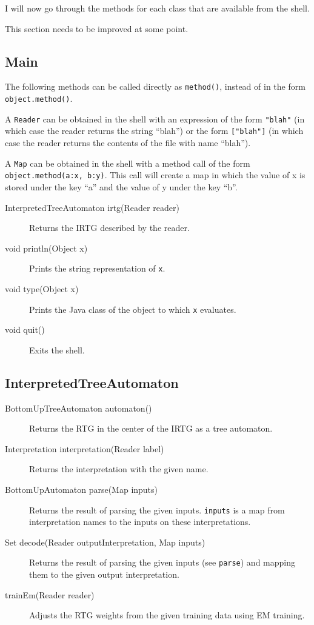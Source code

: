 \documentclass[11pt]{article}
\begin{document}
I will now go through the methods for each class that are available
from the shell.

This section needs to be improved at some point.

\subsection{Main}

The following methods can be called directly as \verb?method()?,
instead of in the form \verb?object.method()?.

A \verb?Reader? can be obtained in the shell with an expression of the
form \verb?"blah"? (in which case the reader returns the string
``blah'') or the form \verb?["blah"]? (in which case the reader
returns the contents of the file with name ``blah'').

A \verb?Map? can be obtained in the shell with a method call of the
form \verb?object.method(a:x, b:y)?. This call will create a map in
which the value of x is stored under the key ``a'' and the value of y
under the key ``b''.

\begin{description}
\item[InterpretedTreeAutomaton irtg(Reader reader)] Returns the IRTG
  described by the reader.
\item[void println(Object x)] Prints the string representation of
  \verb?x?.
\item[void type(Object x)] Prints the Java class of the object to
  which \verb?x? evaluates.
\item[void quit()] Exits the shell.
\end{description}


\subsection{InterpretedTreeAutomaton}

\begin{description}
\item[BottomUpTreeAutomaton automaton()] Returns the RTG in the center
  of the IRTG as a tree automaton.
\item[Interpretation interpretation(Reader label)] Returns the
  interpretation with the given name.
\item[BottomUpAutomaton parse(Map inputs)] Returns the result of
  parsing the given inputs. \verb?inputs? is a map from
  interpretation names to the inputs on these interpretations.
\item[Set decode(Reader outputInterpretation, Map inputs)] Returns the
  result of parsing the given inputs (see \verb?parse?) and mapping
  them to the given output interpretation.
\item[trainEm(Reader reader)] Adjusts the RTG weights from the given
  training data using EM training.
\end{description}
\end{document}
